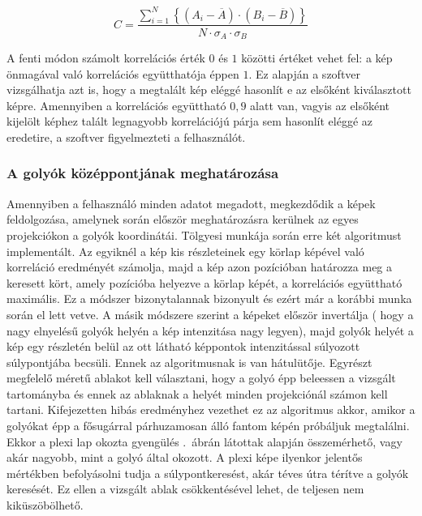 \documentclass[a4paper,12pt]{article}
\begin{document}
\begin{equation}
\label{eq:corr}
C = \frac{ \sum_{i=1}^{N}  \left \{ (A_i  - \overline{A} ) \cdot ( B_i - \overline{B} ) \right \} }{N \cdot \sigma_A  \cdot \sigma_B}
\end{equation}


A fenti módon számolt korrelációs érték $0$ és $1$ közötti értéket vehet fel: a kép önmagával való korrelációs együtthatója éppen $1$. Ez alapján a szoftver vizsgálhatja azt is, hogy a megtalált kép eléggé hasonlít e az elsőként kiválasztott képre. Amennyiben a korrelációs együttható $0,\!9$ alatt van, vagyis az elsőként kijelölt képhez talált legnagyobb korrelációjú párja sem hasonlít eléggé az eredetire, a szoftver figyelmezteti a felhasználót.



\subsubsection{A golyók középpontjának meghatározása}
\label{sec:kozeppont}



Amennyiben a felhasználó minden adatot megadott, megkezdődik a képek feldolgozása, amelynek során először meghatározásra kerülnek az egyes projekciókon a golyók koordinátái. Tölgyesi\cite{botond} munkája során erre két algoritmust implementált. Az egyiknél a kép kis részleteinek egy körlap képével való korreláció eredményét számolja, majd a kép azon pozícióban határozza meg a keresett kört, amely pozícióba helyezve a körlap képét, a korrelációs együttható maximális.   Ez a módszer bizonytalannak bizonyult és ezért már a korábbi munka során el lett vetve. A másik módszere szerint a képeket először invertálja ( hogy a nagy elnyelésű golyók helyén a kép intenzitása nagy legyen), majd golyók helyét a kép egy részletén belül az ott látható képpontok intenzitással súlyozott súlypontjába becsüli.  Ennek az algoritmusnak is van hátulütője. Egyrészt megfelelő méretű ablakot kell választani, hogy a golyó épp beleessen a vizsgált tartományba és ennek az ablaknak a helyét minden projekciónál számon kell tartani. Kifejezetten hibás eredményhez vezethet ez az algoritmus akkor, amikor a golyókat épp a fősugárral párhuzamosan álló fantom képén próbáljuk megtalálni. Ekkor a plexi lap okozta gyengülés .~ábrán látottak alapján összemérhető, vagy akár nagyobb, mint a golyó által okozott. A plexi képe ilyenkor jelentős mértékben befolyásolni tudja a súlypontkeresést, akár téves útra térítve a golyók keresését. Ez ellen a vizsgált ablak csökkentésével lehet, de teljesen nem kiküszöbölhető.
\end{document}
